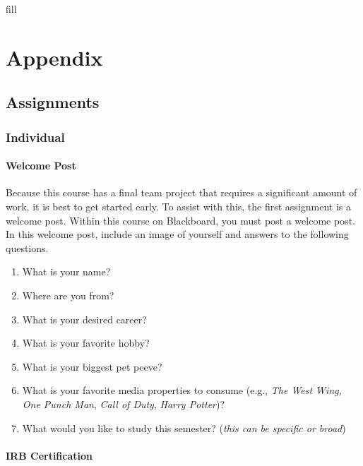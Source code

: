 \documentclass[
  b5paper]{book}
\providecommand{\tightlist}{%
  \setlength{\itemsep}{0pt}\setlength{\parskip}{0pt}}
\begin{document}
fill

\hypertarget{appendix}{%
\chapter{Appendix}\label{appendix}}

\hypertarget{assignments}{%
\section{Assignments}\label{assignments}}

\hypertarget{individual}{%
\subsection*{Individual}\label{individual}}

\hypertarget{welcome-post}{%
\subsubsection*{Welcome Post}\label{welcome-post}}

Because this course has a final team project that requires a significant amount of work, it is best to get started early. To assist with this, the first assignment is a welcome post. Within this course on Blackboard, you must post a welcome post. In this welcome post, include an image of yourself and answers to the following questions.

\begin{enumerate}
\def\labelenumi{\arabic{enumi}.}
\tightlist
\item
  What is your name?
\item
  Where are you from?
\item
  What is your desired career?
\item
  What is your favorite hobby?
\item
  What is your biggest pet peeve?
\item
  What is your favorite media properties to consume (e.g., \emph{The West Wing,} \emph{One Punch Man}, \emph{Call of Duty}, \emph{Harry Potter})?
\item
  What would you like to study this semester? (\emph{this can be specific or broad})
\end{enumerate}

\hypertarget{irb-certification}{%
\subsubsection*{IRB Certification}\label{irb-certification}}
\end{document}
